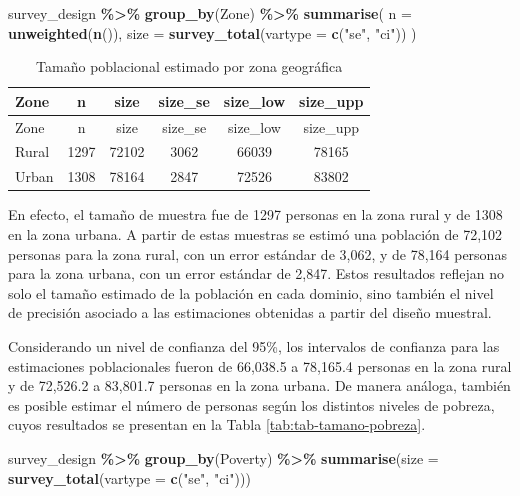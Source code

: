 \documentclass[
  spanish,
  12pt,
]{book}
\newenvironment{Shaded}{\begin{snugshade}}{\end{snugshade}}
\newcommand{\AttributeTok}[1]{\textcolor[rgb]{0.13,0.29,0.53}{#1}}
\newcommand{\FunctionTok}[1]{\textcolor[rgb]{0.13,0.29,0.53}{\textbf{#1}}}
\newcommand{\NormalTok}[1]{#1}
\newcommand{\SpecialCharTok}[1]{\textcolor[rgb]{0.81,0.36,0.00}{\textbf{#1}}}
\newcommand{\StringTok}[1]{\textcolor[rgb]{0.31,0.60,0.02}{#1}}
\begin{document}
\begin{Shaded}
\begin{Highlighting}[]
\NormalTok{survey\_design }\SpecialCharTok{\%\textgreater{}\%}
  \FunctionTok{group\_by}\NormalTok{(Zone) }\SpecialCharTok{\%\textgreater{}\%}
  \FunctionTok{summarise}\NormalTok{(}
    \AttributeTok{n =} \FunctionTok{unweighted}\NormalTok{(}\FunctionTok{n}\NormalTok{()),}
    \AttributeTok{size =} \FunctionTok{survey\_total}\NormalTok{(}\AttributeTok{vartype =} \FunctionTok{c}\NormalTok{(}\StringTok{"se"}\NormalTok{, }\StringTok{"ci"}\NormalTok{))}
\NormalTok{  )}
\end{Highlighting}
\end{Shaded}

\begin{longtable}[]{@{}lccccc@{}}
\caption{\label{tab:tab-tamano-zona}Tamaño poblacional estimado por zona geográfica}\tabularnewline
\toprule\noalign{}
Zone & n & size & size\_se & size\_low & size\_upp \\
\midrule\noalign{}
\endfirsthead
\toprule\noalign{}
Zone & n & size & size\_se & size\_low & size\_upp \\
\midrule\noalign{}
\endhead
\bottomrule\noalign{}
\endlastfoot
Rural & 1297 & 72102 & 3062 & 66039 & 78165 \\
Urban & 1308 & 78164 & 2847 & 72526 & 83802 \\
\end{longtable}

En efecto, el tamaño de muestra fue de 1297 personas en la zona rural y de 1308 en la zona urbana. A partir de estas muestras se estimó una población de 72,102 personas para la zona rural, con un error estándar de 3,062, y de 78,164 personas para la zona urbana, con un error estándar de 2,847. Estos resultados reflejan no solo el tamaño estimado de la población en cada dominio, sino también el nivel de precisión asociado a las estimaciones obtenidas a partir del diseño muestral.

Considerando un nivel de confianza del 95\%, los intervalos de confianza para las estimaciones poblacionales fueron de 66,038.5 a 78,165.4 personas en la zona rural y de 72,526.2 a 83,801.7 personas en la zona urbana. De manera análoga, también es posible estimar el número de personas según los distintos niveles de pobreza, cuyos resultados se presentan en la Tabla \ref{tab:tab-tamano-pobreza}.

\begin{Shaded}
\begin{Highlighting}[]
\NormalTok{survey\_design }\SpecialCharTok{\%\textgreater{}\%}
  \FunctionTok{group\_by}\NormalTok{(Poverty) }\SpecialCharTok{\%\textgreater{}\%}
  \FunctionTok{summarise}\NormalTok{(}\AttributeTok{size =} \FunctionTok{survey\_total}\NormalTok{(}\AttributeTok{vartype =} \FunctionTok{c}\NormalTok{(}\StringTok{"se"}\NormalTok{, }\StringTok{"ci"}\NormalTok{)))}
\end{Highlighting}
\end{Shaded}
\end{document}
